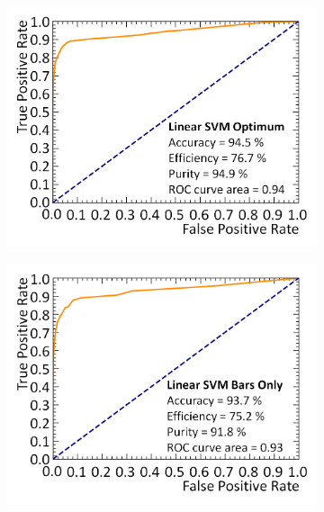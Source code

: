\begin{figure}[!h]
\begin{subfigure}{.4\textwidth}
  \includegraphics[width=\linewidth]{Chapter4.5/Figs/linSvmOptimumRoc.png}
  \captionsetup{width=.9\linewidth}
  \caption{}
  \label{subFig:linSvmOptimumRoc}
\end{subfigure}
\qquad
\begin{subfigure}{.4\textwidth}
  \centering
  \includegraphics[width=\linewidth]{Chapter4.5/Figs/linSvmBarsOnlyRoc.png}
  \captionsetup{width=.9\linewidth}
  \caption{}
  \label{subFig:}
\end{subfigure}
\begin{subfigure}{.4\textwidth}
  \centering

\end{subfigure}
\end{figure}
